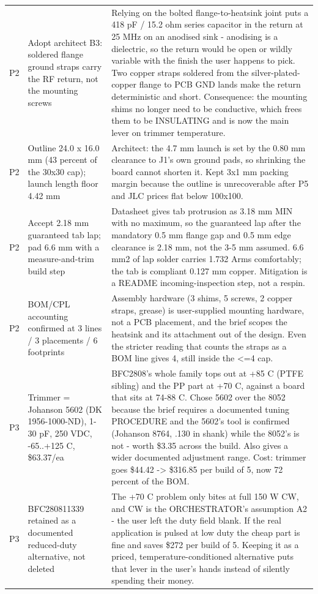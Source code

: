\documentclass[11pt,a4paper]{article}
\begin{document}
{\begin{longtable}{lp{5.2cm}p{7.2cm}}
P2 & Adopt architect B3: soldered flange ground straps carry the RF return, not the mounting screws & Relying on the bolted flange-to-heatsink joint puts a 418 pF / 15.2 ohm series capacitor in the return at 25 MHz on an anodised sink - anodising is a dielectric, so the return would be open or wildly variable with the finish the user happens to pick. Two copper straps soldered from the silver-plated-copper flange to PCB GND lands make the return deterministic and short. Consequence: the mounting shims no longer need to be conductive, which frees them to be INSULATING and is now the main lever on trimmer temperature. \\
P2 & Outline 24.0 x 16.0 mm (43 percent of the 30x30 cap); launch length floor 4.42 mm & Architect: the 4.7 mm launch is set by the 0.80 mm clearance to J1's own ground pads, so shrinking the board cannot shorten it. Kept 3x1 mm packing margin because the outline is unrecoverable after P5 and JLC prices flat below 100x100. \\
P2 & Accept 2.18 mm guaranteed tab lap; pad 6.6 mm with a measure-and-trim build step & Datasheet gives tab protrusion as 3.18 mm MIN with no maximum, so the guaranteed lap after the mandatory 0.5 mm flange gap and 0.5 mm edge clearance is 2.18 mm, not the 3-5 mm assumed. 6.6 mm2 of lap solder carries 1.732 Arms comfortably; the tab is compliant 0.127 mm copper. Mitigation is a README incoming-inspection step, not a respin. \\
P2 & BOM/CPL accounting confirmed at 3 lines / 3 placements / 6 footprints & Assembly hardware (3 shims, 5 screws, 2 copper straps, grease) is user-supplied mounting hardware, not a PCB placement, and the brief scopes the heatsink and its attachment out of the design. Even the stricter reading that counts the straps as a BOM line gives 4, still inside the \textless{}=4 cap. \\
P3 & Trimmer = Johanson 5602 (DK 1956-1000-ND), 1-30 pF, 250 VDC, -65..+125 C, \$63.37/ea & BFC2808's whole family tops out at +85 C (PTFE sibling) and the PP part at +70 C, against a board that sits at 74-88 C. Chose 5602 over the 8052 because the brief requires a documented tuning PROCEDURE and the 5602's tool is confirmed (Johanson 8764, .130 in shank) while the 8052's is not - worth \$3.35 across the build. Also gives a wider documented adjustment range. Cost: trimmer goes \$44.42 -\textgreater{} \$316.85 per build of 5, now 72 percent of the BOM. \\
P3 & BFC280811339 retained as a documented reduced-duty alternative, not deleted & The +70 C problem only bites at full 150 W CW, and CW is the ORCHESTRATOR's assumption A2 - the user left the duty field blank. If the real application is pulsed at low duty the cheap part is fine and saves \$272 per build of 5. Keeping it as a priced, temperature-conditioned alternative puts that lever in the user's hands instead of silently spending their money. \\

\end{longtable}}
\end{document}
